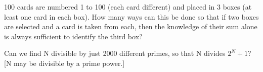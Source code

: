 
\item 100 cards are numbered 1 to 100 (each card different) and placed in 3 boxes (at least one card in each box). How many ways can this be done so that if two boxes are selected and a card is taken from each, then the knowledge of their sum alone is always sufficient to identify the third box?\\

\item Can we find N divisible by just 2000 different primes, so that N divides $2^{N} + 1$? [N may be divisible by a prime power.]


